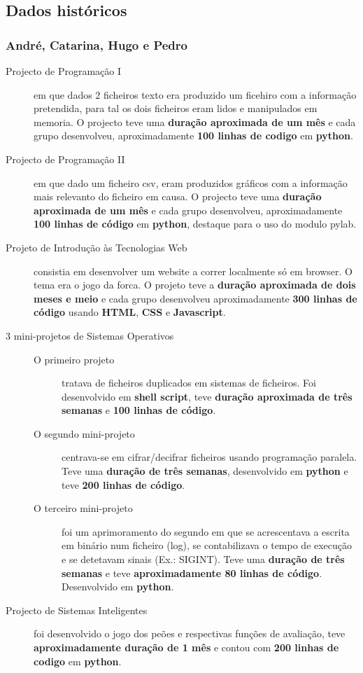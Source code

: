 \documentclass[a4paper]{report}
\begin{document}
\subsection{Dados históricos}
\subsubsection*{André, Catarina, Hugo e Pedro} 
\begin{description}
\item[Projecto de Programação I] em que dados 2 ficheiros texto era produzido um ficehiro com a informação pretendida, para tal os dois ficheiros eram lidos e manipulados em memoria. O projecto teve uma \textbf{duração aproximada de um mês} e cada grupo desenvolveu, aproximadamente \textbf{100 linhas de codigo} em \textbf{python}.

\item[Projecto de Programação II] em que dado um ficheiro csv, eram produzidos gráficos com a informação mais relevanto do ficheiro em causa. O projecto teve uma \textbf{duração aproximada de um mês} e cada grupo desenvolveu, aproximadamente \textbf{100 linhas de código} em \textbf{python}, destaque para o uso do modulo pylab.

\item [Projeto de Introdução às Tecnologias Web] consistia em desenvolver um website a correr localmente só em browser. O tema era o jogo da forca. O projeto teve a \textbf{duração aproximada de dois meses e meio} e cada grupo desenvolveu aproximadamente \textbf{300 linhas de código} usando \textbf{HTML}, \textbf{CSS} e \textbf{Javascript}.

\item[3 mini-projetos de Sistemas Operativos]\mbox{}
	\begin{description}
		\item[O primeiro projeto] tratava de ficheiros duplicados em sistemas de ficheiros. Foi desenvolvido em \textbf{shell script}, teve \textbf{duração aproximada de três semanas} e \textbf{100 linhas de código}.
		
		\item [O segundo mini-projeto] centrava-se em cifrar/decifrar ficheiros usando programação paralela. Teve uma \textbf{duração de três semanas}, desenvolvido em \textbf{python} e teve \textbf{200 linhas de código}.
		
		\item[O terceiro mini-projeto] foi um aprimoramento do segundo em que se acrescentava a escrita em binário num ficheiro (log), se contabilizava o tempo de execução e se detetavam sinais (Ex.: SIGINT). Teve uma \textbf{duração de três semanas} e teve \textbf{aproximadamente 80 linhas de código}. Desenvolvido em \textbf{python}.
	\end{description}
	\item[Projecto de Sistemas Inteligentes] foi desenvolvido o jogo dos peões e respectivas funções de avaliação, teve \textbf{aproximadamente duração de 1 mês} e contou com \textbf{200 linhas de codigo} em \textbf{python}.
\end{description}
\end{document}
